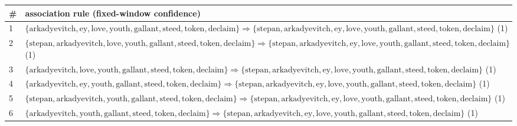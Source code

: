 \begin{appendices}
\begin{longtable}{p{20pt}|p{\dimexpr\textwidth-\tabcolsep-20pt\relax}}
\# & association rule (fixed-window confidence) \\
\hline
1 & $ \{ \text{arkadyevitch},\allowbreak\text{ey},\allowbreak\text{love},\allowbreak\text{youth},\allowbreak\text{gallant},\allowbreak\text{steed},\allowbreak\text{token},\allowbreak\text{declaim} \} \Rightarrow \{ \text{stepan},\allowbreak\text{arkadyevitch},\allowbreak\text{ey},\allowbreak\text{love},\allowbreak\text{youth},\allowbreak\text{gallant},\allowbreak\text{steed},\allowbreak\text{token},\allowbreak\text{declaim} \} $ (1) \\
2 & $ \{ \text{stepan},\allowbreak\text{arkadyevitch},\allowbreak\text{love},\allowbreak\text{youth},\allowbreak\text{gallant},\allowbreak\text{steed},\allowbreak\text{token},\allowbreak\text{declaim} \} \Rightarrow \{ \text{stepan},\allowbreak\text{arkadyevitch},\allowbreak\text{ey},\allowbreak\text{love},\allowbreak\text{youth},\allowbreak\text{gallant},\allowbreak\text{steed},\allowbreak\text{token},\allowbreak\text{declaim} \} $ (1) \\
3 & $ \{ \text{arkadyevitch},\allowbreak\text{love},\allowbreak\text{youth},\allowbreak\text{gallant},\allowbreak\text{steed},\allowbreak\text{token},\allowbreak\text{declaim} \} \Rightarrow \{ \text{stepan},\allowbreak\text{arkadyevitch},\allowbreak\text{ey},\allowbreak\text{love},\allowbreak\text{youth},\allowbreak\text{gallant},\allowbreak\text{steed},\allowbreak\text{token},\allowbreak\text{declaim} \} $ (1) \\
4 & $ \{ \text{arkadyevitch},\allowbreak\text{ey},\allowbreak\text{youth},\allowbreak\text{gallant},\allowbreak\text{steed},\allowbreak\text{token},\allowbreak\text{declaim} \} \Rightarrow \{ \text{stepan},\allowbreak\text{arkadyevitch},\allowbreak\text{ey},\allowbreak\text{love},\allowbreak\text{youth},\allowbreak\text{gallant},\allowbreak\text{steed},\allowbreak\text{token},\allowbreak\text{declaim} \} $ (1) \\
5 & $ \{ \text{stepan},\allowbreak\text{arkadyevitch},\allowbreak\text{youth},\allowbreak\text{gallant},\allowbreak\text{steed},\allowbreak\text{token},\allowbreak\text{declaim} \} \Rightarrow \{ \text{stepan},\allowbreak\text{arkadyevitch},\allowbreak\text{ey},\allowbreak\text{love},\allowbreak\text{youth},\allowbreak\text{gallant},\allowbreak\text{steed},\allowbreak\text{token},\allowbreak\text{declaim} \} $ (1) \\
6 & $ \{ \text{arkadyevitch},\allowbreak\text{youth},\allowbreak\text{gallant},\allowbreak\text{steed},\allowbreak\text{token},\allowbreak\text{declaim} \} \Rightarrow \{ \text{stepan},\allowbreak\text{arkadyevitch},\allowbreak\text{ey},\allowbreak\text{love},\allowbreak\text{youth},\allowbreak\text{gallant},\allowbreak\text{steed},\allowbreak\text{token},\allowbreak\text{declaim} \} $ (1) \\

\end{longtable}
\end{appendices}
